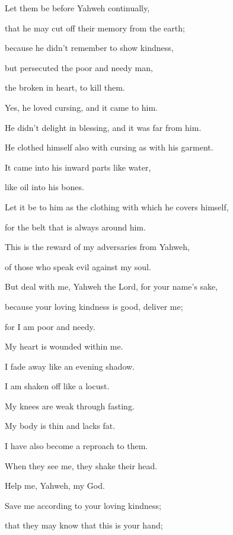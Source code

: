 {\par }{\Q {}Let them be before Yahweh continually,
\par }{\QB that he may cut off their memory from the earth;
\par }{\Q {}because he didn’t remember to show kindness,
\par }{\QB but persecuted the poor and needy man,
\par }{\QB the broken in heart, to kill them.
\par }{\Q {}Yes, he loved cursing, and it came to him.
\par }{\QB He didn’t delight in blessing, and it was far from him.
\par }{\Q {}He clothed himself also with cursing as with his garment.
\par }{\QB It came into his inward parts like water,
\par }{\QB like oil into his bones.
\par }{\Q {}Let it be to him as the clothing with which he covers himself,
\par }{\QB for the belt that is always around him.
\par }{\Q {}This is the reward of my adversaries from Yahweh,
\par }{\QB of those who speak evil against my soul.
\par }{\BB \par }{\Q {}But deal with me, Yahweh the Lord, for your name’s sake,
\par }{\QB because your loving kindness is good, deliver me;
\par }{\QB {}for I am poor and needy.
\par }{\QB My heart is wounded within me.
\par }{\Q {}I fade away like an evening shadow.
\par }{\QB I am shaken off like a locust.
\par }{\Q {}My knees are weak through fasting.
\par }{\QB My body is thin and lacks fat.
\par }{\Q {}I have also become a reproach to them.
\par }{\QB When they see me, they shake their head.
\par }{\Q {}Help me, Yahweh, my God.
\par }{\QB Save me according to your loving kindness;
\par }{\Q {}that they may know that this is your hand;
}
